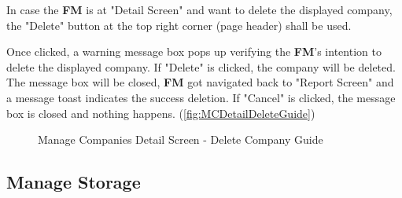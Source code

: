 \bigskip
In case the \textbf{FM} is at "Detail Screen" and want to delete the displayed company, the "Delete" button at the top right corner (page header) shall be used. 

Once clicked, a warning message box pops up verifying the \textbf{FM}'s intention to delete the displayed company. If "Delete" is clicked, the company will be deleted. The message box will be closed, \textbf{FM} got navigated back to "Report Screen" and a message toast indicates the success deletion. If "Cancel" is clicked, the message box is closed and nothing happens. (\autoref{fig:MCDetailDeleteGuide})

\begin{figure}[H]
	\centering
    \vspace{10pt}
    \caption{Manage Companies Detail Screen - Delete Company Guide}
	\label{fig:MCDetailDeleteGuide}
\end{figure}



\subsection{Manage Storage}
\label{subsec:ms}

